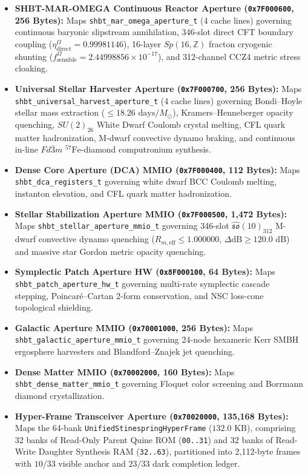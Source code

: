 \documentclass[11pt,onecolumn]{article}
\begin{document}
\begin{itemize}
    \item \textbf{SHBT-MAR-OMEGA Continuous Reactor Aperture (\texttt{0x7F000600}, 256 Bytes):} Maps \texttt{shbt\_mar\_omega\_aperture\_t} (4 cache lines) governing continuous baryonic slipstream annihilation, 346-slot direct CFT boundary coupling ($\eta_{\text{direct}}^{\Omega} = 0.99981146$), 16-layer $Sp(16,\mathbb{Z})$ fracton cryogenic shunting ($f_{\text{sensible}}^{\Omega} = 2.44998856 \times 10^{-17}$), and 312-channel CCZ4 metric stress cloaking.
    \item \textbf{Universal Stellar Harvester Aperture (\texttt{0x7F000700}, 256 Bytes):} Maps \texttt{shbt\_universal\_harvest\_aperture\_t} (4 cache lines) governing Bondi--Hoyle stellar mass extraction ($\le 18.26\text{ days}/M_\odot$), Kramers--Henneberger opacity quenching, $SU(2)_{26}$ White Dwarf Coulomb crystal melting, CFL quark matter hadronization, M-dwarf convective dynamo braking, and continuous in-line $Fd\bar{3}m$ $^{57}\text{Fe}$-diamond computronium synthesis.
    \item \textbf{Dense Core Aperture (DCA) MMIO (\texttt{0x7F000400}, 112 Bytes):} Maps \texttt{shbt\_dca\_registers\_t} governing white dwarf BCC Coulomb melting, instanton elevation, and CFL quark matter hadronization.
    \item \textbf{Stellar Stabilization Aperture MMIO (\texttt{0x7F000500}, 1,472 Bytes):} Maps \texttt{shbt\_stellar\_aperture\_mmio\_t} governing 346-slot $\hat{\mathfrak{so}}(10)_{312}$ M-dwarf convective dynamo quenching ($R_{m,\text{eff}} \le 1.000000$, $\Delta\text{dB} \ge 120.0\text{ dB}$) and massive star Gordon metric opacity quenching.
    \item \textbf{Symplectic Patch Aperture HW (\texttt{0x8F000100}, 64 Bytes):} Maps \texttt{shbt\_patch\_aperture\_hw\_t} governing multi-rate symplectic cascade stepping, Poincar\'e--Cartan 2-form conservation, and NSC loss-cone topological shielding.
    \item \textbf{Galactic Aperture MMIO (\texttt{0x70001000}, 256 Bytes):} Maps \texttt{shbt\_galactic\_aperture\_mmio\_t} governing 24-node hexameric Kerr SMBH ergosphere harvesters and Blandford--Znajek jet quenching.
    \item \textbf{Dense Matter MMIO (\texttt{0x70002000}, 160 Bytes):} Maps \texttt{shbt\_dense\_matter\_mmio\_t} governing Floquet color screening and Borrmann diamond crystallization.
    \item \textbf{Hyper-Frame Transceiver Aperture (\texttt{0x70020000}, 135,168 Bytes):} Maps the 64-bank \texttt{UnifiedStinespringHyperFrame} ($132.0\text{ KB}$), comprising 32 banks of Read-Only Parent Quine ROM (\texttt{00..31}) and 32 banks of Read-Write Daughter Synthesis RAM (\texttt{32..63}), partitioned into 2,112-byte frames with $10/33$ visible anchor and $23/33$ dark completion ledger.

\end{itemize}
\end{document}
